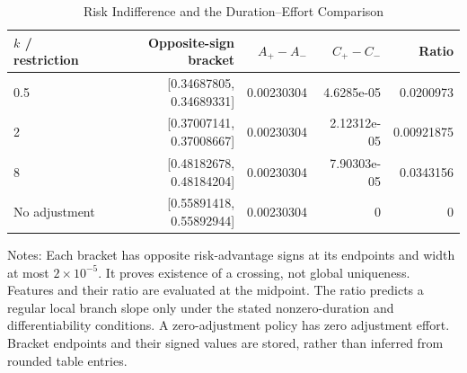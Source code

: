 \begin{table}[!htbp]
\centering\small
\caption{Risk Indifference and the Duration--Effort Comparison}
\label{tab:r6_frontier}
\begin{tabular}{lrrrr}
\toprule
$k$ / restriction & Opposite-sign bracket & $A_+-A_-$ & $C_+-C_-$ & Ratio \\
\midrule
0.5 & [0.34687805, 0.34689331] & 0.00230304 & 4.6285e-05 & 0.0200973 \\
2 & [0.37007141, 0.37008667] & 0.00230304 & 2.12312e-05 & 0.00921875 \\
8 & [0.48182678, 0.48184204] & 0.00230304 & 7.90303e-05 & 0.0343156 \\
No adjustment & [0.55891418, 0.55892944] & 0.00230304 & 0 & 0 \\
\bottomrule
\end{tabular}
\par\smallskip
\begin{minipage}{0.98\linewidth}\footnotesize
Notes: Each bracket has opposite risk-advantage signs at its endpoints and width at most $2\times10^{-5}$. It proves existence of a crossing, not global uniqueness. Features and their ratio are evaluated at the midpoint. The ratio predicts a regular local branch slope only under the stated nonzero-duration and differentiability conditions. A zero-adjustment policy has zero adjustment effort. Bracket endpoints and their signed values are stored, rather than inferred from rounded table entries.
\end{minipage}
\end{table}
